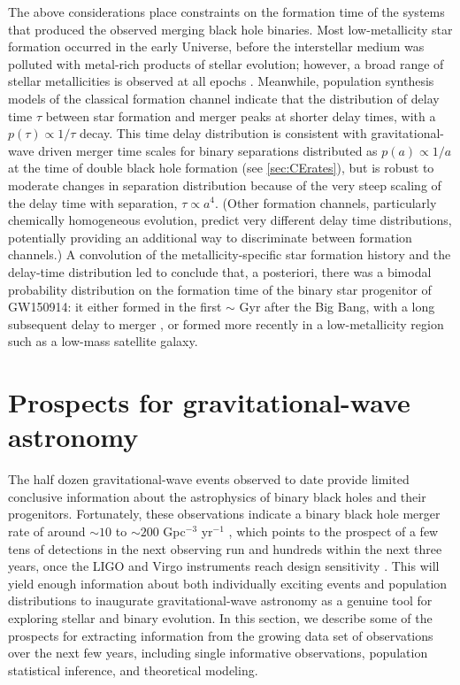 \documentclass[iop,onecolumn]{revtex4-1}
\begin{document}
The above considerations place constraints on the formation time of the systems that produced the observed merging black hole binaries. Most low-metallicity star formation occurred in the early Universe, before the interstellar medium was polluted with metal-rich products of stellar evolution; however, a broad range of stellar metallicities is observed at all epochs  \citep[e.g.,][]{LangerNorman:2006,TaylorKobayashi:2015}. Meanwhile, population synthesis models of the classical formation channel indicate that the distribution of delay time $\tau$ between star formation and merger peaks at shorter delay times, with a $p(\tau) \propto 1/\tau$ decay.  This time delay distribution is consistent with gravitational-wave driven merger time scales for binary separations distributed as $p(a) \propto 1/a$ at the time of double black hole formation (see \autoref{sec:CErates}), but  is robust to moderate changes in separation distribution because of the very steep scaling of the delay time with separation, $\tau \propto a^4$.  (Other formation channels, particularly chemically homogeneous evolution, predict very different delay time distributions, potentially providing an additional way to discriminate between formation channels.)  A convolution of the metallicity-specific star formation history and the delay-time distribution led \citet{Belczynski:2016} to conclude that, a posteriori, there was a bimodal probability distribution on the formation time of the binary star progenitor of GW150914: it either formed in the first $\sim$ Gyr after the Big Bang, with a long subsequent delay to merger \citep{Dominik:2014}, or formed more recently in a low-metallicity region such as a low-mass satellite galaxy.  

  

\section{Prospects for gravitational-wave astronomy}\label{prospect}

The half dozen gravitational-wave events observed to date provide limited conclusive information about the astrophysics of binary black holes and their progenitors.  Fortunately, these observations indicate a binary black hole merger rate of around $\sim 10$ to $\sim 200$ Gpc$^{-3}$ yr$^{-1}$ \citep{GW150914:rates,GW170104}, which points to the prospect of a few tens of detections in the next observing run and hundreds within the next three years, once the LIGO and Virgo instruments reach design sensitivity \citep{scenarios}.  This will yield enough information about both individually exciting events and population distributions to inaugurate gravitational-wave astronomy as a genuine tool for exploring stellar and binary evolution.  In this section, we describe some of the prospects for extracting information from the growing data set of observations over the next few years, including single informative observations, population statistical inference, and theoretical modeling.
\end{document}
